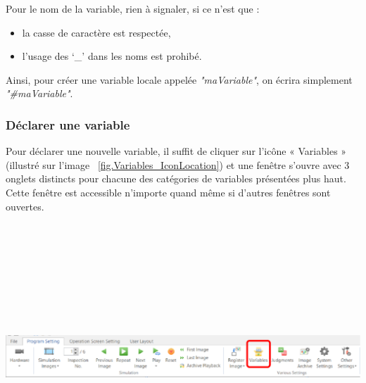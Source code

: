 \noindent Pour le nom de la variable, rien à signaler, si ce n’est que :
\begin{itemize}
\item la casse de caractère est respectée,
\item l’usage des ‘\_’ dans les noms est prohibé.
\end{itemize}
\vspace{0.2cm}

\noindent Ainsi, pour créer une variable locale appelée \textit{"maVariable"}, on écrira simplement \textit{"\#maVariable"}.


\subsubsection{Déclarer une variable}
\label{Sec.Variables_Declaration}
Pour déclarer une nouvelle variable, il suffit de cliquer sur l’icône « Variables » (illustré sur l'image ~\ref{fig.Variables_IconLocation}) et une fenêtre s’ouvre avec 3 onglets distincts pour chacune des catégories de variables présentées plus haut. Cette fenêtre est accessible n’importe quand même si d’autres fenêtres sont ouvertes.\\
\vspace{0.2cm}

\noindent
\begin{minipage}[c]{\textwidth}
  \centering
  \includegraphics[width=16cm, height=10cm, keepaspectratio]{addOns/LaboCalib_Variables_Icon.png}
  \label{fig.Variables_IconLocation}
\end{minipage}\\
\vspace{0.2cm}

